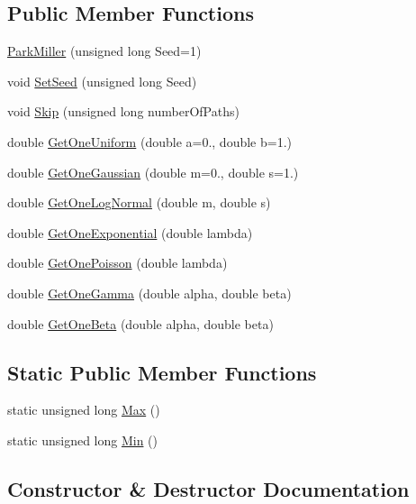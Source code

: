 \subsection*{Public Member Functions}
\begin{DoxyCompactItemize}
\item 
\hyperlink{classParkMiller_a481e3b13d3418fb101da56061bfc584c}{Park\+Miller} (unsigned long Seed=1)
\item 
void \hyperlink{classParkMiller_a8ce7de074caf860ea6dfbaa99379a1e7}{Set\+Seed} (unsigned long Seed)
\item 
void \hyperlink{classParkMiller_a3d88f2c2e95baca1f5ac628705fa6f15}{Skip} (unsigned long number\+Of\+Paths)
\item 
double \hyperlink{classParkMiller_aec52ec51d2ae52497a7ace62d8982a8b}{Get\+One\+Uniform} (double a=0., double b=1.)
\item 
double \hyperlink{classParkMiller_acf46034ebd112741d620c36c72b73d39}{Get\+One\+Gaussian} (double m=0., double s=1.)
\item 
double \hyperlink{classParkMiller_a812ca3d4d91694bdfa2453978c6324b3}{Get\+One\+Log\+Normal} (double m, double s)
\item 
double \hyperlink{classParkMiller_a0dab2b782320012c1e339f4848cb32c7}{Get\+One\+Exponential} (double lambda)
\item 
double \hyperlink{classParkMiller_a442faf6c8b598b54295852e0c5c4a3c6}{Get\+One\+Poisson} (double lambda)
\item 
double \hyperlink{classParkMiller_a7b1adfa2d2ea88542842a00281c70e94}{Get\+One\+Gamma} (double alpha, double beta)
\item 
double \hyperlink{classParkMiller_a76e1a3f096128dbd63208dd1a7880279}{Get\+One\+Beta} (double alpha, double beta)
\end{DoxyCompactItemize}
\subsection*{Static Public Member Functions}
\begin{DoxyCompactItemize}
\item 
static unsigned long \hyperlink{classParkMiller_a2bd97c9ae7113ed67aa533eb62d7097d}{Max} ()
\item 
static unsigned long \hyperlink{classParkMiller_a6033d2fe1a8e143e673fdb53b3ee5523}{Min} ()
\end{DoxyCompactItemize}


\subsection{Constructor \& Destructor Documentation}
\hypertarget{classParkMiller_a481e3b13d3418fb101da56061bfc584c}{}\label{classParkMiller_a481e3b13d3418fb101da56061bfc584c} 
